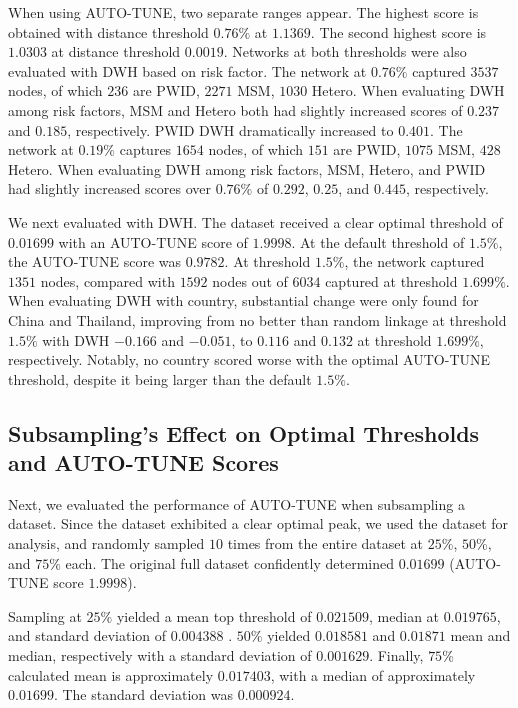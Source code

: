 \documentclass[utf8]{FrontiersinHarvard} %
\begin{document}
When using AUTO-TUNE, two separate ranges appear. The highest score is obtained
with distance threshold $0.76\%$ at $1.1369$. The second highest score is
$1.0303$ at distance threshold $0.0019$. Networks at both thresholds were also
evaluated with DWH based on risk factor. The network at $0.76\%$ captured
$3537$ nodes, of which $236$ are PWID, $2271$ MSM, $1030$ Hetero. When
evaluating DWH among risk factors, MSM and Hetero both had slightly increased
scores of $0.237$ and $0.185$, respectively. PWID DWH dramatically increased to
$0.401$. The network at $0.19\%$ captures $1654$ nodes, of which $151$ are
PWID, $1075$ MSM, $428$ Hetero. When evaluating DWH among risk factors, MSM,
Hetero, and PWID had slightly increased scores over $0.76\%$ of $0.292$,
$0.25$, and $0.445$, respectively.

We next evaluated \cite{rhee_national_2019} with DWH. The dataset received a
clear optimal threshold of $0.01699$ with an AUTO-TUNE score of $1.9998$. At
the default threshold of $1.5\%$, the AUTO-TUNE score was $0.9782$. At
threshold $1.5\%$, the network captured $1351$ nodes, compared with $1592$
nodes out of $6034$ captured at threshold $1.699\%$. When evaluating DWH with
country, substantial change were only found for China and Thailand, improving
from no better than random linkage at threshold $1.5\%$ with DWH $-0.166$ and
$-0.051$, to $0.116$ and $0.132$ at threshold $1.699\%$, respectively. Notably,
no country scored worse with the optimal AUTO-TUNE threshold, despite it being
larger than the default $1.5\%$. \label{fig:scoreAbove2}

\subsection{Subsampling's Effect on Optimal Thresholds and AUTO-TUNE Scores}

Next, we evaluated the performance of AUTO-TUNE when subsampling a dataset.
Since the \cite{rhee_national_2019} dataset exhibited a clear optimal peak, we
used the dataset for analysis, and randomly sampled $10$ times from the entire
dataset at $25\%$, $50\%$, and $75\%$ each. The original full dataset
confidently determined $0.01699$ (AUTO-TUNE score $1.9998$). 

Sampling at $25\%$ yielded a mean top threshold of $0.021509$, median at
$0.019765$, and standard deviation of $0.004388$ \label{fig:subsampling}.
$50\%$ yielded $0.018581$ and $0.01871$ mean and median, respectively with a
standard deviation of $0.001629$. Finally, $75\%$ calculated mean is
approximately $0.017403$, with a median of approximately $0.01699$. The
standard deviation was $0.000924$.
\end{document}
